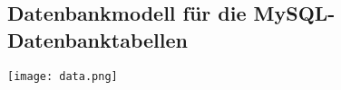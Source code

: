 \subsection{Datenbankmodell für die MySQL-Datenbanktabellen}
\label{app:datenbank}
\begin{center}
\texttt{[image: data.png]}
\end{center}